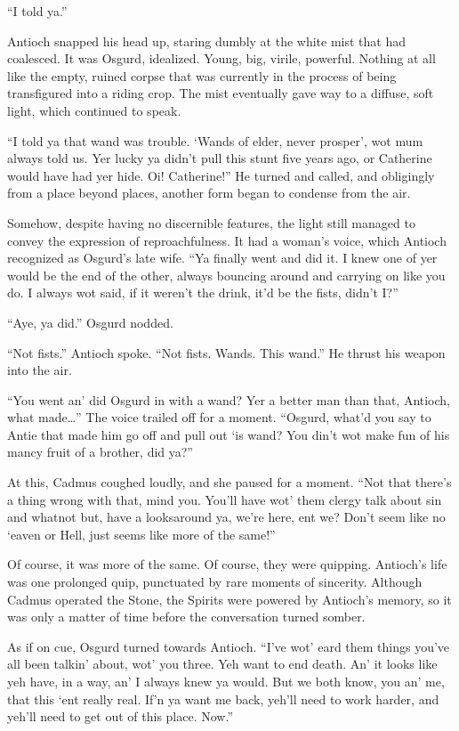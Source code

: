 “I told ya.”

Antioch snapped his head up, staring dumbly at the white mist that had coalesced. It was Osgurd, idealized. Young, big, virile, powerful. Nothing at all like the empty, ruined corpse that was currently in the process of being transfigured into a riding crop. The mist eventually gave way to a diffuse, soft light, which continued to speak.

“I told ya that wand was trouble. ‘Wands of elder, never prosper’, wot mum always told us. Yer lucky ya didn’t pull this stunt five years ago, or Catherine would have had yer hide. Oi! Catherine!” He turned and called, and obligingly from a place beyond places, another form began to condense from the air.

Somehow, despite having no discernible features, the light still managed to convey the expression of reproachfulness. It had a woman’s voice, which Antioch recognized as Osgurd’s late wife. “Ya finally went and did it. I knew one of yer would be the end of the other, always bouncing around and carrying on like you do. I always wot said, if it weren’t the drink, it’d be the fists, didn’t I?”

“Aye, ya did.” Osgurd nodded.

“Not fists.” Antioch spoke. “Not fists. Wands. This wand.” He thrust his weapon into the air.

“You went an’ did Osgurd in with a wand? Yer a better man than that, Antioch, what made…” The voice trailed off for a moment. “Osgurd, what’d you say to Antie that made him go off and pull out ‘is wand? You din’t wot make fun of his mancy fruit of a brother, did ya?”

At this, Cadmus coughed loudly, and she paused for a moment. “Not that there’s a thing wrong with that, mind you. You’ll have wot’ them clergy talk about sin and whatnot but, have a looksaround ya, we’re here, ent we? Don’t seem like no ‘eaven or Hell, just seems like more of the same!”

Of course, it was more of the same. Of course, they were quipping. Antioch’s life was one prolonged quip, punctuated by rare moments of sincerity. Although Cadmus operated the Stone, the Spirits were powered by Antioch’s memory, so it was only a matter of time before the conversation turned somber.

As if on cue, Osgurd turned towards Antioch. “I’ve wot’ eard them things you’ve all been talkin’ about, wot’ you three. Yeh want to end death. An’ it looks like yeh have, in a way, an’ I always knew ya would. But we both know, you an’ me, that this ‘ent really real. If’n ya want me back, yeh’ll need to work harder, and yeh’ll need to get out of this place. Now.”

